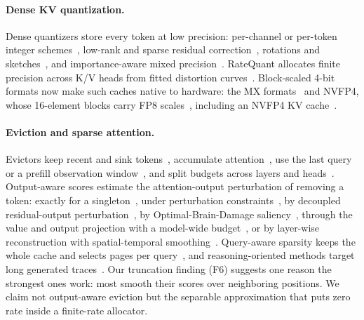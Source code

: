 \documentclass{article}
\theoremstyle{definition}
\begin{document}
\paragraph{Dense KV quantization.}
Dense quantizers store every token at low precision: per-channel or per-token integer schemes~\citep{liu2024kivi,hooper2024kvquant}, low-rank and sparse residual correction~\citep{kang2024gear}, rotations and sketches~\citep{zandieh2024qjl,zandieh2025turboquant}, and importance-aware mixed precision~\citep{yang2024mikv,he2024zipcache}.  RateQuant allocates finite precision across K/V heads from fitted distortion curves~\citep{zuo2026ratequant}.  Block-scaled 4-bit formats now make such caches native to hardware: the MX formats~\citep{ocp2023mx} and NVFP4, whose 16-element blocks carry FP8 scales~\citep{alvarez2025nvfp4}, including an NVFP4 KV cache~\citep{alvarez2025nvfp4kv}.
\paragraph{Eviction and sparse attention.}
Evictors keep recent and sink tokens~\citep{xiao2024streamingllm}, accumulate attention~\citep{zhang2023h2o,liu2023scissorhands}, use the last query~\citep{oren2024tova} or a prefill observation window~\citep{li2024snapkv}, and split budgets across layers and heads~\citep{cai2024pyramidkv,feng2024adakv}.  
Output-aware scores estimate the attention-output perturbation of removing a token: exactly for a singleton~\citep{goel2025caote}, under perturbation constraints~\citep{feng2026criticalkv}, by decoupled residual-output perturbation~\citep{zhang2026dropkv}, by Optimal-Brain-Damage saliency~\citep{gu2026obcache}, through the value and output projection with a model-wide budget~\citep{mai2026laprox}, or by layer-wise reconstruction with spatial-temporal smoothing~\citep{an2026restkv}. 
 Query-aware sparsity keeps the whole cache and selects pages per query~\citep{tang2024quest}, and reasoning-oriented methods target long generated traces~\citep{cai2025rkv,mao2026triattention}.  
Our truncation finding (F6) suggests one reason the strongest ones work: most smooth their scores over neighboring positions.  %
We claim not output-aware eviction but the separable approximation that puts zero rate inside a finite-rate allocator.
\end{document}
